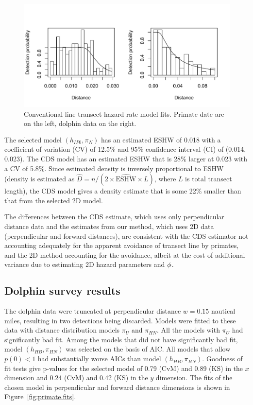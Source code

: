 \documentclass[useAMS,usenatbib,referee]{biom}
\begin{document}
\begin{figure}
\caption{Conventional line transect hazard rate model fits. Primate date are on the left, dolphin data on the right. \label{fig:CDSplots}}
\includegraphics[scale=1]{CDSplots.pdf}
\end{figure}

The selected model $(h_{IP0},\pi_{N})$ has an estimated ESHW of 0.018 with a coefficient of variation (CV) of 12.5\% and 95\% confidence interval (CI) of (0.014, 0.023). The CDS model has an estimated ESHW that is 28\% larger at 0.023  with a CV of 5.8\%. Since estimated density is inversely proportional to ESHW (density is estimated as $\hat{D}=n/(2\times\widehat{\mbox{ESHW}}\times L)$, where $L$ is total transect length), the CDS model gives a density estimate that is some 22\% smaller than that from the selected 2D model.

The differences between the CDS estimate, which uses only perpendicular distance data and the estimates from our method, which uses 2D data (perpendicular and forward distances), are consistent with the CDS estimator not accounting adequately for the apparent avoidance of transect line by primates, and the 2D method accounting for the avoidance, albeit at the cost of additional variance due to estimating 2D hazard parameters and $\boldmath{\phi}$.

\subsection{Dolphin survey results}

The dolphin data were truncated at perpendicular distance $w=0.15$ nautical miles, resulting in two detections being discarded. Models were fitted to these data with distance distribution models $\pi_{U}$ and $\pi_{HN}$. All the models with $\pi_{U}$ had significantly bad fit. Among the models that did not have significantly bad fit, model $(h_{HB},\pi_{HN})$ was selected on the basis of AIC. All models that allow $p(0)<1$ had substantially worse AICs than model $(h_{HB},\pi_{HN})$. Goodness of fit tests give p-values for the selected model of 0.79  (CvM)  and 0.89 (KS) in the $x$ dimension and 0.24 (CvM)  and 0.42 (KS) in the $y$ dimension. The fits of the chosen model in perpendicular and forward distance dimensions is shown in Figure~\ref{fig:primate.fits}.
\end{document}
